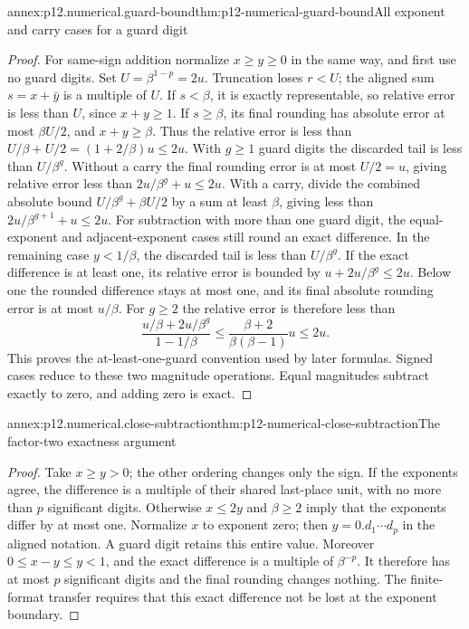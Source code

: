 \begin{annexitem}{annex:p12.numerical.guard-bound}{thm:p12-numerical-guard-bound}{All exponent and carry cases for a guard digit}
\begin{proof}
For same-sign addition normalize \(x\geq y\geq0\) in the same way,
and first use no guard digits. Set \(U=\beta^{1-p}=2u\).
Truncation loses \(r<U\); the aligned sum \(s=x+\bar y\) is a
multiple of \(U\). If \(s<\beta\), it is exactly representable,
so relative error is less than \(U\), since \(x+y\geq1\).
If \(s\geq\beta\), its final rounding has absolute error at most
\(\beta U/2\), and \(x+y\geq\beta\). Thus the relative error is
less than \(U/\beta+U/2=(1+2/\beta)u\leq2u\).
With \(g\geq1\) guard digits the discarded tail is less than
\(U/\beta^g\). Without a carry the final rounding error is at most
\(U/2=u\), giving relative error less than
\(2u/\beta^g+u\leq2u\). With a carry, divide the combined
absolute bound \(U/\beta^g+\beta U/2\) by a sum at least
\(\beta\), giving less than \(2u/\beta^{g+1}+u\leq2u\).
For subtraction with more than one guard digit, the equal-exponent
and adjacent-exponent cases still round an exact difference. In the
remaining case \(y<1/\beta\), the discarded tail is less than
\(U/\beta^g\). If the exact difference is at least one, its
relative error is bounded by \(u+2u/\beta^g\leq2u\).
Below one the rounded difference stays at most one, and its final
absolute rounding error is at most \(u/\beta\). For \(g\geq2\)
the relative error is therefore less than
\[
 \frac{u/\beta+2u/\beta^g}{1-1/\beta}
 \leq\frac{\beta+2}{\beta(\beta-1)}u\leq2u.
\]
This proves the at-least-one-guard convention used by later formulas. Signed cases
reduce to these two magnitude operations. Equal magnitudes subtract
exactly to zero, and adding zero is exact.
\end{proof}
\end{annexitem}

\begin{annexitem}{annex:p12.numerical.close-subtraction}{thm:p12-numerical-close-subtraction}{The factor-two exactness argument}
\begin{proof}
Take \(x\geq y>0\); the other ordering changes only the sign. If the
exponents agree, the difference is a multiple of their shared last-place
unit, with no more than \(p\) significant digits. Otherwise
\(x\leq2y\) and \(\beta\geq2\) imply that the exponents differ by
at most one. Normalize \(x\) to exponent zero; then
\(y=0.d_1\cdots d_p\) in the aligned notation. A guard digit retains
this entire value. Moreover \(0\leq x-y\leq y<1\), and the exact
difference is a multiple of \(\beta^{-p}\). It therefore has at most
\(p\) significant digits and the final rounding changes nothing.
The finite-format transfer requires that this exact difference not be
lost at the exponent boundary.
\end{proof}
\end{annexitem}

